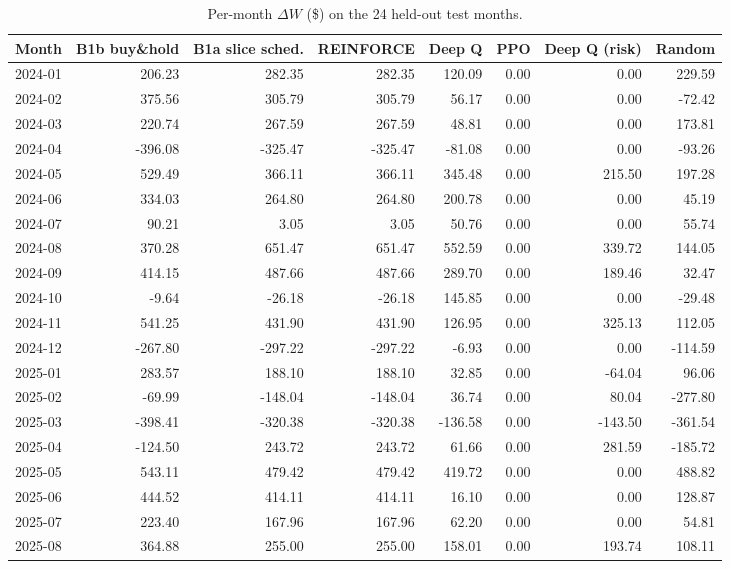 \begin{table}[h]
\centering
\caption{Per-month $\Delta W$ (\$) on the 24 held-out test months.}
\label{tab:permonth}
\small
\begin{tabular}{lrrrrrrr}
\toprule
\textbf{Month} & \textbf{B1b buy\&hold} & \textbf{B1a slice sched.} & \textbf{REINFORCE} & \textbf{Deep Q} & \textbf{PPO} & \textbf{Deep Q (risk)} & \textbf{Random} \\
\midrule
2024-01 & 206.23 & 282.35 & 282.35 & 120.09 & 0.00 & 0.00 & 229.59 \\
2024-02 & 375.56 & 305.79 & 305.79 & 56.17 & 0.00 & 0.00 & -72.42 \\
2024-03 & 220.74 & 267.59 & 267.59 & 48.81 & 0.00 & 0.00 & 173.81 \\
2024-04 & -396.08 & -325.47 & -325.47 & -81.08 & 0.00 & 0.00 & -93.26 \\
2024-05 & 529.49 & 366.11 & 366.11 & 345.48 & 0.00 & 215.50 & 197.28 \\
2024-06 & 334.03 & 264.80 & 264.80 & 200.78 & 0.00 & 0.00 & 45.19 \\
2024-07 & 90.21 & 3.05 & 3.05 & 50.76 & 0.00 & 0.00 & 55.74 \\
2024-08 & 370.28 & 651.47 & 651.47 & 552.59 & 0.00 & 339.72 & 144.05 \\
2024-09 & 414.15 & 487.66 & 487.66 & 289.70 & 0.00 & 189.46 & 32.47 \\
2024-10 & -9.64 & -26.18 & -26.18 & 145.85 & 0.00 & 0.00 & -29.48 \\
2024-11 & 541.25 & 431.90 & 431.90 & 126.95 & 0.00 & 325.13 & 112.05 \\
2024-12 & -267.80 & -297.22 & -297.22 & -6.93 & 0.00 & 0.00 & -114.59 \\
2025-01 & 283.57 & 188.10 & 188.10 & 32.85 & 0.00 & -64.04 & 96.06 \\
2025-02 & -69.99 & -148.04 & -148.04 & 36.74 & 0.00 & 80.04 & -277.80 \\
2025-03 & -398.41 & -320.38 & -320.38 & -136.58 & 0.00 & -143.50 & -361.54 \\
2025-04 & -124.50 & 243.72 & 243.72 & 61.66 & 0.00 & 281.59 & -185.72 \\
2025-05 & 543.11 & 479.42 & 479.42 & 419.72 & 0.00 & 0.00 & 488.82 \\
2025-06 & 444.52 & 414.11 & 414.11 & 16.10 & 0.00 & 0.00 & 128.87 \\
2025-07 & 223.40 & 167.96 & 167.96 & 62.20 & 0.00 & 0.00 & 54.81 \\
2025-08 & 364.88 & 255.00 & 255.00 & 158.01 & 0.00 & 193.74 & 108.11 \\

\end{tabular}
\end{table}
